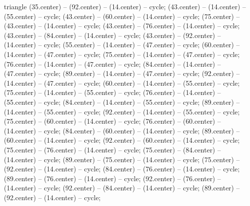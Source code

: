 \begin{pgfonlayer}{triangle}
 (35.center) -- (92.center) -- (14.center) -- cycle; 
 (43.center) -- (14.center) -- (55.center) -- cycle; 
 (43.center) -- (60.center) -- (14.center) -- cycle; 
 (75.center) -- (43.center) -- (14.center) -- cycle; 
 (43.center) -- (76.center) -- (14.center) -- cycle; 
 (43.center) -- (84.center) -- (14.center) -- cycle; 
 (43.center) -- (92.center) -- (14.center) -- cycle; 
 (55.center) -- (14.center) -- (47.center) -- cycle; 
 (60.center) -- (14.center) -- (47.center) -- cycle; 
 (75.center) -- (14.center) -- (47.center) -- cycle; 
 (76.center) -- (14.center) -- (47.center) -- cycle; 
 (84.center) -- (14.center) -- (47.center) -- cycle; 
 (89.center) -- (14.center) -- (47.center) -- cycle; 
 (92.center) -- (14.center) -- (47.center) -- cycle; 
 (60.center) -- (14.center) -- (55.center) -- cycle; 
 (75.center) -- (14.center) -- (55.center) -- cycle; 
 (76.center) -- (14.center) -- (55.center) -- cycle; 
 (84.center) -- (14.center) -- (55.center) -- cycle; 
 (89.center) -- (14.center) -- (55.center) -- cycle; 
 (92.center) -- (14.center) -- (55.center) -- cycle; 
 (75.center) -- (60.center) -- (14.center) -- cycle; 
 (76.center) -- (60.center) -- (14.center) -- cycle; 
 (84.center) -- (60.center) -- (14.center) -- cycle; 
 (89.center) -- (60.center) -- (14.center) -- cycle; 
 (92.center) -- (60.center) -- (14.center) -- cycle; 
 (75.center) -- (76.center) -- (14.center) -- cycle; 
 (75.center) -- (84.center) -- (14.center) -- cycle; 
 (89.center) -- (75.center) -- (14.center) -- cycle; 
 (75.center) -- (92.center) -- (14.center) -- cycle; 
 (84.center) -- (76.center) -- (14.center) -- cycle; 
 (89.center) -- (76.center) -- (14.center) -- cycle; 
 (92.center) -- (76.center) -- (14.center) -- cycle; 
 (92.center) -- (84.center) -- (14.center) -- cycle; 
 (89.center) -- (92.center) -- (14.center) -- cycle; 

\end{pgfonlayer}
